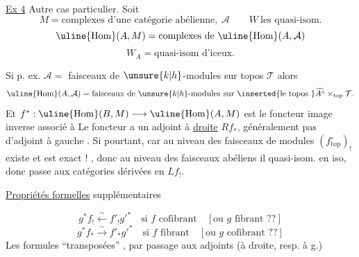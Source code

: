 \uline{Ex 4} Autre cas particulier. Soit
\[
M=\text{complexes d'une catégorie abélienne},\ \mathcal A
\qquad W\ \text{les quasi-isom.}
\]
\[
\uline{\operatorname{Hom}}(A,M)=\text{complexes de }\uline{\operatorname{Hom}}(A,\mathcal A)
\]
\[
W_A=\text{quasi-isom d'iceux.}
\]

Si p. ex. $\mathcal A=$ faisceaux de $\unsure{k|h}$-modules sur topos
 $\mathcal T$
alors
\[
\uline{\operatorname{Hom}}(A,\mathcal A)=
\text{faisceaux de $\unsure{k|h}$-modules sur }\inserted{\text{le topos }}
\widehat{A^\circ}\mathbin{\times_{\mathrm{top}}}\mathcal T.
\]
Et $f^*:\uline{\operatorname{Hom}}(B,M)\longrightarrow
\uline{\operatorname{Hom}}(A,M)$ est le foncteur image inverse associé à
Le foncteur 
a un adjoint à \uline{droite} $R f_*$,
 généralement pas d'adjoint à gauche
.
Si pourtant, car au niveau des  faisceaux de modules
$(f^\circ_{\mathrm{top}})_!$ existe et est exact !
, donc
au niveau des  faisceaux abéliens il
 quasi-isom. en iso, donc
passe aux catégories dérivées en $L f_!$.

\uline{Propriétés formelles} supplémentaires

\[
g^* f_!\xleftarrow{\sim}f'_!g'^*
\quad\text{si }f\text{ cofibrant}\quad[\text{ou }g\text{ fibrant ??}]
\]
\[
g^* f_*\xrightarrow{\sim}f'_*g'^*
\quad\text{si }f\text{ fibrant}\quad[\text{ou }g\text{ cofibrant ??}]
\]
Les formules  ``transposées'' ,
par passage aux adjoints (à droite, resp. à g.)

